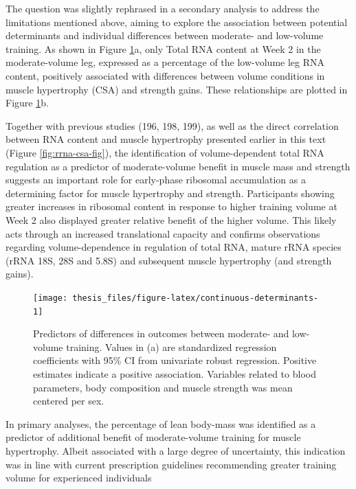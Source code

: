 \documentclass[twoside,10pt]{gihclass} %
\begin{document}
The question was slightly rephrased in a secondary analysis to address the limitations mentioned above, aiming to explore the association between potential determinants and individual differences between moderate- and low-volume training.
As shown in Figure \ref{fig:continuous-determinants}a, only Total RNA content at Week 2 in the moderate-volume leg, expressed as a percentage of the low-volume leg RNA content, positively associated with differences between volume conditions in muscle hypertrophy (CSA) and strength gains. These relationships are plotted in Figure \ref{fig:continuous-determinants}b.

Together with previous studies
(196, 198, 199),
as well as the direct correlation between RNA content and muscle hypertrophy presented earlier in this text
(Figure \ref{fig:rrna-csa-fig}),
the identification of volume-dependent total RNA regulation as a predictor of moderate-volume benefit in muscle mass and strength suggests an important role for early-phase ribosomal accumulation as a determining factor for muscle hypertrophy and strength.
Participants showing greater increases in ribosomal content in response to higher training volume at Week 2 also displayed greater relative benefit of the higher volume.
This likely acts through an increased translational capacity and confirms observations regarding volume-dependence in regulation of total RNA, mature rRNA species (rRNA 18S, 28S and 5.8S) and subsequent muscle hypertrophy (and strength gains).
\begin{figure}

{\centering \texttt{[image: thesis\_files/figure-latex/continuous-determinants-1]} 

}

\caption[Determinanats of moderate- over low-volume benefit]{Predictors of differences in outcomes between moderate- and low-volume training. Values in (a) are standardized regression coefficients with 95\% CI from univariate robust regression. Positive estimates indicate a positive association. Variables related to blood parameters, body composition and muscle strength was mean centered per sex.}\label{fig:continuous-determinants}
\end{figure}
In primary analyses, the percentage of lean body-mass was identified as a predictor of additional benefit of moderate-volume training for muscle hypertrophy.
Albeit associated with a large degree of uncertainty, this indication was in line with current prescription guidelines recommending greater training volume for experienced individuals
\end{document}
